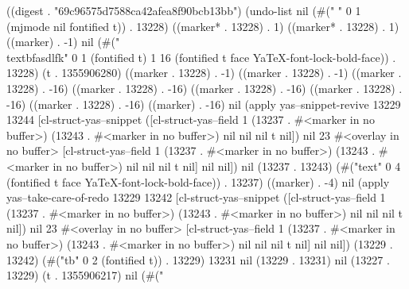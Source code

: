 
((digest . "69c96575d7588ca42afea8f90bcb13bb") (undo-list nil (#("
" 0 1 (mjmode nil fontified t)) . 13228) ((marker* . 13228) . 1) ((marker* . 13228) . 1) ((marker) . -1) nil (#(" \\textbf{asdlfk}" 0 1 (fontified t) 1 16 (fontified t face YaTeX-font-lock-bold-face)) . 13228) (t . 1355906280) ((marker . 13228) . -1) ((marker . 13228) . -1) ((marker . 13228) . -16) ((marker . 13228) . -16) ((marker . 13228) . -16) ((marker . 13228) . -16) ((marker . 13228) . -16) ((marker) . -16) nil (apply yas--snippet-revive 13229 13244 [cl-struct-yas--snippet ([cl-struct-yas--field 1 (13237 . #<marker in no buffer>) (13243 . #<marker in no buffer>) nil nil nil t nil]) nil 23 #<overlay in no buffer> [cl-struct-yas--field 1 (13237 . #<marker in no buffer>) (13243 . #<marker in no buffer>) nil nil nil t nil] nil nil]) nil (13237 . 13243) (#("text" 0 4 (fontified t face YaTeX-font-lock-bold-face)) . 13237) ((marker) . -4) nil (apply yas--take-care-of-redo 13229 13242 [cl-struct-yas--snippet ([cl-struct-yas--field 1 (13237 . #<marker in no buffer>) (13243 . #<marker in no buffer>) nil nil nil t nil]) nil 23 #<overlay in no buffer> [cl-struct-yas--field 1 (13237 . #<marker in no buffer>) (13243 . #<marker in no buffer>) nil nil nil t nil] nil nil]) (13229 . 13242) (#("tb" 0 2 (fontified t)) . 13229) 13231 nil (13229 . 13231) nil (13227 . 13229) (t . 1355906217) nil (#("
